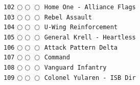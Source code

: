\documentclass[a4paper,landscape]{article}
\begin{document}
\begin{multicols*}{5}
\texttt{102} \(\bigcirc\!\bigcirc\!\bigcirc\)  \texttt{Home One - Alliance Flags} \vspace{-0.3mm}\\ 
\texttt{103} \(\bigcirc\!\bigcirc\!\bigcirc\)  \texttt{Rebel Assault} \vspace{-0.3mm}\\ 
\texttt{104} \(\bigcirc\!\bigcirc\!\bigcirc\)  \texttt{U-Wing Reinforcement} \vspace{-0.3mm}\\ 
\texttt{105} \(\bigcirc\!\bigcirc\!\bigcirc\)  \texttt{General Krell - Heartless} \vspace{-0.3mm}\\ 
\texttt{106} \(\bigcirc\!\bigcirc\!\bigcirc\)  \texttt{Attack Pattern Delta} \vspace{-0.3mm}\\ 
\texttt{107} \(\bigcirc\!\bigcirc\!\bigcirc\)  \texttt{Command} \vspace{-0.3mm}\\ 
\texttt{108} \(\bigcirc\!\bigcirc\!\bigcirc\)  \texttt{Vanguard Infantry} \vspace{-0.3mm}\\ 
\texttt{109} \(\bigcirc\!\bigcirc\!\bigcirc\)  \texttt{Colonel Yularen - ISB Dir} \vspace{-0.3mm}\\ 

\end{multicols*}
\end{document}
